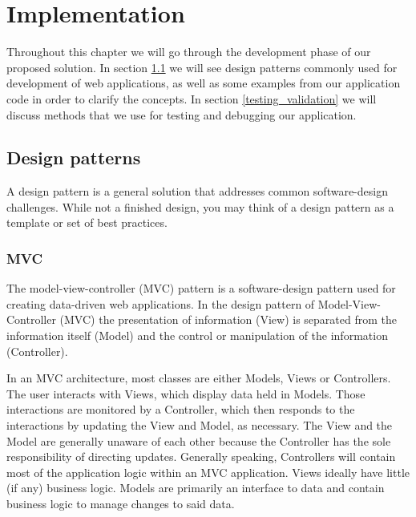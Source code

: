 \chapter{Implementation}
\label{chapter5}
\thispagestyle{plain}
Throughout this chapter we will go through the development phase of our proposed solution. In section \ref{design_patterns} we will see design patterns commonly used for development of web applications, as well as some examples from our application code in order to clarify the concepts. In section \ref{testing_validation} we will discuss methods that we use for testing and debugging our application.



\section{Design patterns}
\label{design_patterns}
A design pattern is a general solution that addresses common software-design challenges. While not a finished design, you may think of a design pattern as a template or set of best practices. \cite{mvc_ref}
\subsection{MVC}
The model-view-controller (MVC) pattern is a software-design pattern used for creating data-driven web applications. 
In the design pattern of Model-View-Controller (MVC) the presentation of information (View) is separated from the information itself (Model) and the control or manipulation of the information (Controller).\cite{mvc_ref2} 

In an MVC architecture, most classes are either Models, Views or Controllers. The user interacts with Views, which display data held in Models. Those interactions are monitored by a Controller, which then responds to the interactions by updating the View and Model, as necessary. The View and the Model are generally unaware of each other because the Controller has the sole responsibility of directing updates. Generally speaking, Controllers will contain most of the application logic within an MVC application. Views ideally have little (if any) business logic. Models are primarily an interface to data and contain business logic to manage changes to said data.

